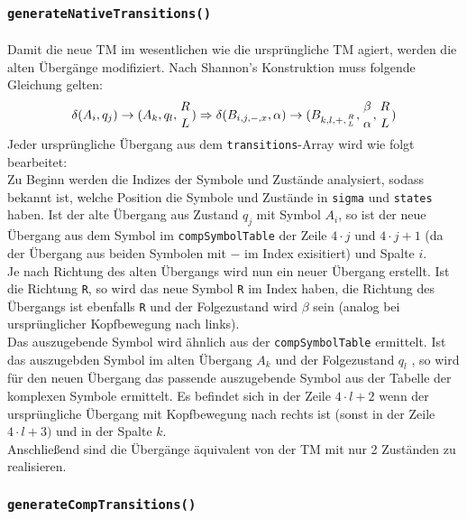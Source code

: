 \documentclass[10pt, a4paper]{article}
\newcommand{\ilc}{\texttt}
\begin{document}
\subsubsection*{\ilc{generateNativeTransitions()}}
\paragraph*{}
Damit die neue TM im wesentlichen wie die ursprüngliche TM agiert, werden die alten Übergänge modifiziert. Nach Shannon's Konstruktion muss folgende Gleichung gelten:
\begin{equation}
\delta(A_i,q_j) \to (A_k,q_l,{R \atop L}) \Rightarrow \delta(B_{i,j,-,x},\alpha) \to (B_{k,l,+,{R \atop L} },{\beta \atop \alpha},{R \atop L})
\end{equation}
Jeder ursprüngliche Übergang aus dem \ilc{transitions}-Array wird wie folgt bearbeitet:\\
Zu Beginn werden die Indizes der Symbole und Zustände analysiert, sodass bekannt ist, welche Position die Symbole und Zustände in \ilc{sigma} und \ilc{states} haben. Ist der alte Übergang aus Zustand $q_j$ mit Symbol $A_i$, so ist der neue Übergang aus dem Symbol im \ilc{compSymbolTable} der Zeile $4\cdot j$ und $4\cdot j+1$ (da der Übergang aus beiden Symbolen mit $-$ im Index exisitiert) und Spalte $i$.\\
Je nach Richtung des alten Übergangs wird nun ein neuer Übergang erstellt. Ist die Richtung \ilc{R}, so wird das neue Symbol \ilc{R} im Index haben, die Richtung des Übergangs ist ebenfalls \ilc{R} und der Folgezustand wird $\beta$ sein (analog bei ursprünglicher Kopfbewegung nach links).\\
Das auszugebende Symbol wird ähnlich aus der \ilc{compSymbolTable} ermittelt. Ist das auszugebden Symbol im alten Übergang $A_k$ und der Folgezustand $q_l$ , so wird für den neuen Übergang das passende auszugebende Symbol aus der Tabelle der komplexen Symbole ermittelt. Es befindet sich in der Zeile $4\cdot l +2$ wenn der ursprüngliche Übergang mit Kopfbewegung nach rechts ist (sonst in der Zeile $4\cdot l +3)$ und in der Spalte $k$.\\
Anschließend sind die Übergänge äquivalent von der TM mit nur 2 Zuständen zu realisieren.\par

\subsubsection*{\ilc{generateCompTransitions()}}
\end{document}
